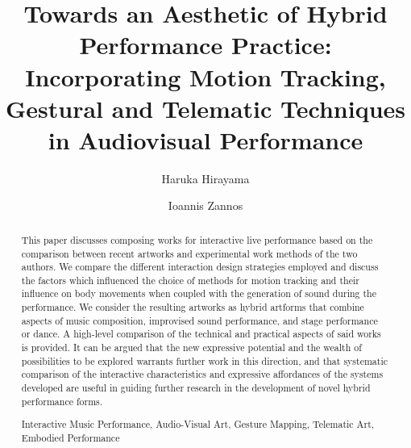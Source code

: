 \documentclass[runningheads,a4paper]{llncs}
\newcommand{\keywords}[1]{\par\addvspace\baselineskip
\noindent\keywordname\enspace\ignorespaces#1}
\begin{document}
\mainmatter  %

\title{Towards an Aesthetic of Hybrid Performance Practice: Incorporating Motion Tracking, Gestural and Telematic Techniques in Audiovisual Performance}


%
%
\author{Haruka Hirayama\and Ioannis Zannos}
%


%
%

\maketitle

\begin{abstract}
This paper discusses composing works for interactive live performance
based on the comparison between recent artworks and experimental work
methods of the two authors. We compare the different interaction design
strategies employed and discuss the factors which influenced the choice
of methods for motion tracking and their influence on body movements
when coupled with the generation of sound during the performance. We
consider the resulting artworks as hybrid artforms that combine aspects
of music composition, improvised sound performance, and stage
performance or dance. A high-level comparison of the technical and
practical aspects of said works is provided. It can be argued that the
new expressive potential and the wealth of possibilities to be explored
warrants further work in this direction, and that systematic comparison
of the interactive characteristics and expressive affordances of the
systems developed are useful in guiding further research in the
development of novel hybrid performance forms.

\keywords{Interactive Music Performance, Audio-Visual Art, Gesture
Mapping, Telematic Art, Embodied Performance}
\end{abstract}
\end{document}
